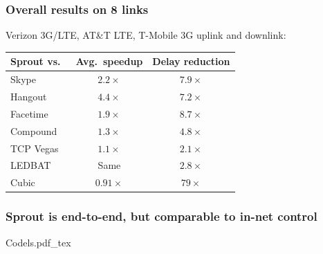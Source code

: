 \documentclass[svgnames]{beamer}
\begin{document}
\begin{frame}
pdf_tex}}\only<12>{\def\svgwidth{\columnwidth}\footnotesize{T-Mobile3GUMTS-Uplink.pdf_tex}}
\end{frame}

\begin{frame}
\frametitle{Overall results on 8 links}

Verizon 3G/LTE, AT\&T LTE, T-Mobile 3G uplink and downlink:

\vspace{\baselineskip}

\begin{tabular}{|l|c|c|}
\hline
{\color{blue}Sprout} vs.~ & Avg.~speedup & Delay reduction \\
\hline
\hline
{\color{red}Skype} & $2.2\times$ & $7.9\times$ \\
{\color{red}Hangout} & $4.4\times$ & $7.2\times$ \\
{\color{red}Facetime} & $1.9\times$ & $8.7\times$ \\
\hline
{\color{ForestGreen}Compound} & $1.3\times$ & $4.8\times$ \\
{\color{ForestGreen}TCP Vegas} & $1.1\times$ & $2.1\times$ \\
{\color{ForestGreen}LEDBAT} & Same & $2.8\times$ \\
{\color{Orange}Cubic} & \cellcolor{red!20} $0.91\times$ & $79\times$ \\
\hline
\end{tabular}

\end{frame}

\begin{frame}
\frametitle{Sprout is end-to-end, but comparable to in-net control}
\vspace{-1 cm}
\def\svgwidth{\columnwidth}\footnotesize{Codels.pdf_tex}
\end{frame}

%
%
%
%
%
%
%
%
\end{document}

